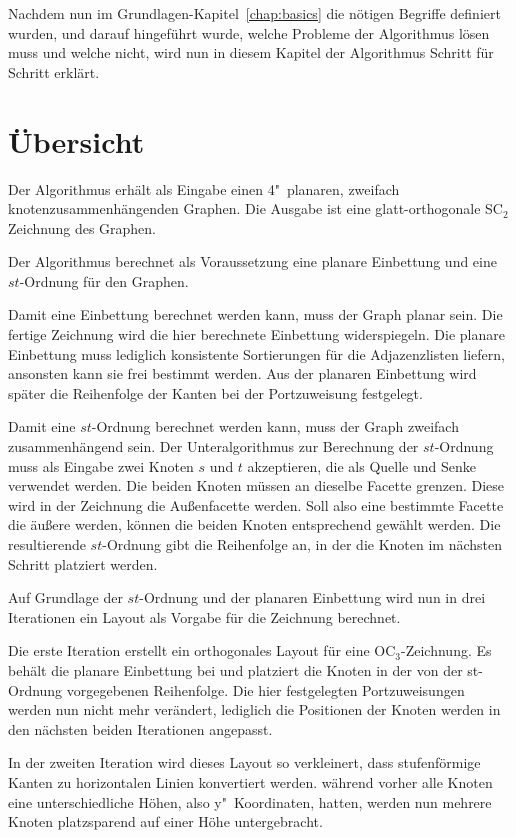 \documentclass[a4paper]{scrreprt}
\theoremstyle{definition}
\begin{document}
Nachdem nun im Grundlagen-Kapitel~\ref{chap:basics} die nötigen Begriffe definiert wurden, und darauf hingeführt wurde, welche Probleme der Algorithmus lösen muss und welche nicht, wird nun in diesem Kapitel der Algorithmus Schritt für Schritt erklärt.

\section{Übersicht}

Der Algorithmus erhält als Eingabe einen 4"~planaren, zweifach knotenzusammenhängenden Graphen. Die Ausgabe ist eine glatt-orthogonale SC$_2$ Zeichnung des Graphen.

Der Algorithmus berechnet als Voraussetzung eine planare Einbettung und eine $st$-Ordnung für den Graphen.

Damit eine Einbettung berechnet werden kann, muss der Graph planar sein. Die fertige Zeichnung wird die hier berechnete Einbettung widerspiegeln. Die planare Einbettung muss lediglich konsistente Sortierungen für die Adjazenzlisten liefern, ansonsten kann sie frei bestimmt werden. Aus der planaren Einbettung wird später die Reihenfolge der Kanten bei der Portzuweisung festgelegt.

Damit eine $st$-Ordnung berechnet werden kann, muss der Graph zweifach zusammenhängend sein. Der Unteralgorithmus zur Berechnung der $st$-Ordnung muss als Eingabe zwei Knoten $s$ und $t$ akzeptieren, die als Quelle und Senke verwendet werden. Die beiden Knoten müssen an dieselbe Facette grenzen. Diese wird in der Zeichnung die Außenfacette werden. Soll also eine bestimmte Facette die äußere werden, können die beiden Knoten entsprechend gewählt werden. Die resultierende $st$-Ordnung gibt die Reihenfolge an, in der die Knoten im nächsten Schritt platziert werden.

Auf Grundlage der $st$-Ordnung und der planaren Einbettung wird nun in drei Iterationen ein Layout als Vorgabe für die Zeichnung berechnet. 

Die erste Iteration erstellt ein orthogonales Layout für eine OC$_3$-Zeichnung. Es behält die planare Einbettung bei und platziert die Knoten in der von der st-Ordnung vorgegebenen Reihenfolge. Die hier festgelegten Portzuweisungen werden nun nicht mehr verändert, lediglich die Positionen der Knoten werden in den nächsten beiden Iterationen angepasst.

In der zweiten Iteration wird dieses Layout so verkleinert, dass stufenförmige Kanten zu horizontalen Linien konvertiert werden. während vorher alle Knoten eine unterschiedliche Höhen, also y"~Koordinaten, hatten, werden nun mehrere Knoten platzsparend auf einer Höhe untergebracht.
\end{document}
